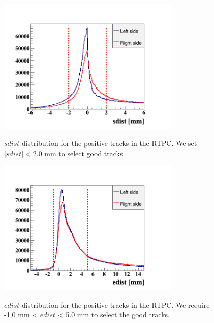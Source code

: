 \begin{itemize}
\begin{figure}[tbp]
\begin{minipage}[c]{.46\linewidth}
\hspace{-0.3in}
\includegraphics[height=6.5cm]{fig_rtpc/rtpc_sdist.png}
\caption{$sdist$ distribution for the positive tracks in the RTPC. We set $|sdist| < 2.0$ mm to select good tracks.} 
\vspace{0.3in}
\label{fig:rrtpc_sdist}
\end{minipage} \hfill
\begin{minipage}[c]{.46\linewidth}
\hspace{-0.3in}
\includegraphics[height=6.5cm]{fig_rtpc/rtpc_edist.png}
\caption{$edist$ distribution for the positive tracks in the RTPC. We require -1.0 mm < $edist$ < 5.0 mm to select the good tracks.}
\vspace{+0.2in}
\label{fig:rrtpc_edist}
\end{minipage}
\end{figure}



\end{itemize}
